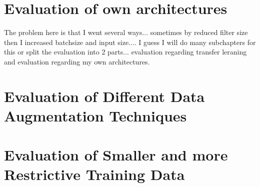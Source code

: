 \section{Evaluation of own architectures}

The problem here is that I went several ways... sometimes by reduced filter size then I increased batchsize and input size.... I guess I will do many subchapters for this or split the evaluation into 2 parts... evaluation regarding transfer leraning and evaluation regarding my own architectures.

\section{Evaluation of Different Data Augmentation Techniques}

\section{Evaluation of Smaller and more Restrictive Training Data}

